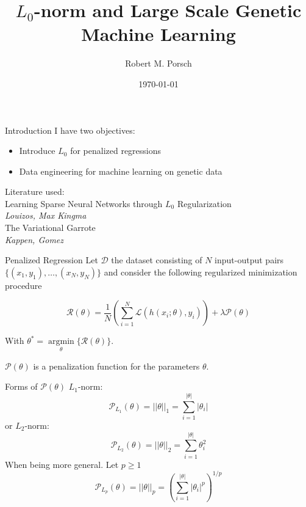 \documentclass{beamer}
\title{$L_0$-norm and Large Scale Genetic Machine Learning}
\date{\today}
\author{Robert M. Porsch}
\institute{Center of Genomic Science}
\DeclareMathOperator*{\argmin}{argmin}
\begin{document}
\maketitle

\begin{frame}[t]{Introduction}
  I have two objectives:
  \begin{itemize}
    \item Introduce $L_0$ for penalized regressions
    \item Data engineering for machine learning on genetic data
  \end{itemize}
  Literature used:\\
  Learning Sparse Neural Networks through $L_0$ Regularization \\
  \emph{Louizos, Max Kingma} \\
  \vspace{0.5cm}
  The Variational Garrote \\
  \emph{Kappen,  Gomez}
\end{frame}

\begin{frame}[t]{Penalized Regression}
  Let $\mathcal{D}$ the dataset consisting of $N$ input-output pairs $\{(x_1, y_1), \ldots, (x_N, y_N)\}$ and consider the following regularized minimization procedure

  \begin{equation} 
    \mathcal{R}(\theta) = \frac{1}{N} ( \sum^N_{i=1} \mathcal{L}(h(x_i; \theta), y_i)) + \lambda\mathcal{P}(\theta)
  \end{equation}

  With $\theta^* = \underset{\theta}{\argmin}\{\mathcal{R}(\theta)\}$.

  $\mathcal{P}(\theta)$ is a penalization function for the parameters $\theta$.
\end{frame}

\begin{frame}[t]{Forms of $\mathcal{P}(\theta)$}
  $L_1$-norm:
  \begin{equation}
    \mathcal{P}_{L_1}(\theta) = ||\theta||_1 = \sum^{|\theta|}_{i=1} |\theta_i|
  \end{equation}
  or $L_2$-norm:
  \begin{equation}
    \mathcal{P}_{L_2}(\theta) = ||\theta||_2 =  \sum^{|\theta|}_{i=1} \theta_i^2
  \end{equation}
  When being more general. Let $p \geq 1$
  \begin{equation}
    \mathcal{P}_{L_p}(\theta) = ||\theta||_p = (\sum^{|\theta|}_{i=1} |\theta_i|^{p})^{1/p}
  \end{equation}
\end{frame}
\end{document}
